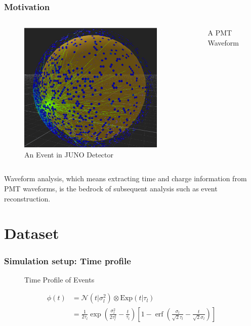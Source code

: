 \documentclass{beamer}
\DeclareMathOperator{\erf}{erf}
\begin{document}
\begin{CJK*}{UTF8}{gbsn}
\begin{frame}
\frametitle{Motivation}
\begin{columns}
\begin{figure}
    \centering
    \includegraphics[width=1.0\linewidth]{img/10-Figure7-1.png}
    \caption{An Event in JUNO Detector\cite{zhu_method_2019}}
\end{figure}
\begin{figure}
    \centering
    \resizebox{\textwidth}{!}{}
    \caption{A PMT Waveform}
\end{figure}
\end{columns}
\begin{block}{}
Waveform analysis, which means extracting time and charge information from PMT waveforms, is the bedrock of subsequent analysis such as event reconstruction. 
\end{block}
\end{frame}

\section{Dataset}

\begin{frame}
\frametitle{Simulation setup: Time profile}
\begin{figure}
    \centering
    \resizebox{0.6\textwidth}{!}{}
    \caption{Time Profile of Events}
\end{figure}
\begin{align*}
    \phi(t) &= \mathcal{N}(t|\sigma_l^2)\otimes \mathrm{Exp}(t|\tau_l) \\
    &= \frac{1}{2\tau_l} \exp\left(\frac{\sigma_l^2}{2\tau_l^2}-\frac{t}{\tau_l}\right) \left[1 - \erf\left( \frac{\sigma_l}{\sqrt{2}\tau_l} - \frac{t}{\sqrt{2}\sigma_l} \right)\right]
\end{align*}
\end{frame}


\end{CJK*}
\end{document}
